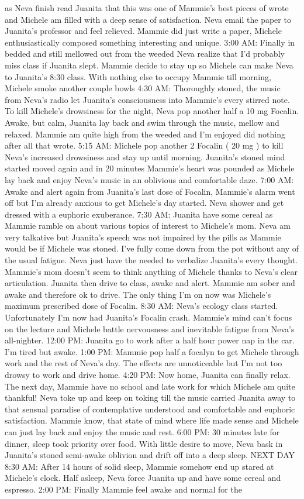 \documentclass[12pt]{book}
\begin{document}
as Neva finish read Juanita that this was one of Mammie's best pieces of wrote and Michele am filled with a deep sense of satisfaction. Neva email the paper to Juanita's professor and feel relieved. Mammie did just write a paper, Michele enthusiastically composed something interesting and unique. 3:00 AM: Finally in bedded and still mellowed out from the weeded Neva realize that I'd probably miss class if Juanita slept. Mammie decide to stay up so Michele can make Neva to Juanita's 8:30 class. With nothing else to occupy Mammie till morning, Michele smoke another couple bowls 4:30 AM: Thoroughly stoned, the music from Neva's radio let Juanita's consciousness into Mammie's every stirred note. To kill Michele's drowsiness for the night, Neva pop another half a 10 mg Focalin. Awake, but calm, Juanita lay back and swim through the music, mellow and relaxed. Mammie am quite high from the weeded and I'm enjoyed did nothing after all that wrote. 5:15 AM: Michele pop another 2 Focalin ( 20 mg ) to kill Neva's increased drowsiness and stay up until morning. Juanita's stoned mind started moved again and in 20 minutes Mammie's heart was pounded as Michele lay back and enjoy Neva's music in an oblivious and comfortable daze. 7:00 AM: Awake and alert again from Juanita's last dose of Focalin, Mammie's alarm went off but I'm already anxious to get Michele's day started. Neva shower and get dressed with a euphoric exuberance. 7:30 AM: Juanita have some cereal as Mammie ramble on about various topics of interest to Michele's mom. Neva am very talkative but Juanita's speech was not impaired by the pills as Mammie would be if Michele was stoned. I've fully come down from the pot without any of the usual fatigue. Neva just have the needed to verbalize Juanita's every thought. Mammie's mom doesn't seem to think anything of Michele thanks to Neva's clear articulation. Juanita then drive to class, awake and alert. Mammie am sober and awake and therefore ok to drive. The only thing I'm on now was Michele's maximum prescribed dose of Focalin. 8:30 AM: Neva's ecology class started. Unfortunately I'm now had Juanita's Focalin crash. Mammie's mind can't focus on the lecture and Michele battle nervousness and inevitable fatigue from Neva's all-nighter. 12:00 PM: Juanita go to work after a half hour power nap in the car. I'm tired but awake. 1:00 PM: Mammie pop half a focalyn to get Michele through work and the rest of Neva's day. The effects are unnoticeable but I'm not too drowsy to work and drive home. 4:20 PM: Now home, Juanita can finally relax. The next day, Mammie have no school and late work for which Michele am quite thankful! Neva toke up and keep on toking till the music carried Juanita away to that sensual paradise of contemplative understood and comfortable and euphoric satisfaction. Mammie know, that state of mind where life made sense and Michele can just lay back and enjoy the music and rest. 6:00 PM: 30 minutes late for dinner, sleep took priority over food. With little desire to move, Neva bask in Juanita's stoned semi-awake oblivion and drift off into a deep sleep. NEXT DAY 8:30 AM: After 14 hours of solid sleep, Mammie somehow end up stared at Michele's clock. Half asleep, Neva force Juanita up and have some cereal and espresso. 2:00 PM: Finally Mammie feel awake and normal for the 
\end{document}
